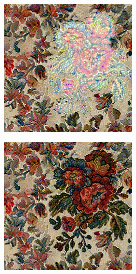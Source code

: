 \begin{figure}[]
\begin{subfigure}{\textwidth}
\begin{subfigure}{0.24\textwidth}
            \caption*{}
        \end{subfigure}
        \hfill
        \begin{subfigure}{0.24\textwidth}
            \centering
            \includegraphics[width=\textwidth]{images/04-experiment01/flowers/1000/some_im.jpg}
            \caption*{}
        \end{subfigure}
        \hfill
        \begin{subfigure}{0.24\textwidth}
            \centering
            \includegraphics[width=\textwidth]{images/04-experiment01/flowers/1000/some_proj.jpg}
            \caption*{}
        \end{subfigure}
        

\end{subfigure}
\end{figure}
